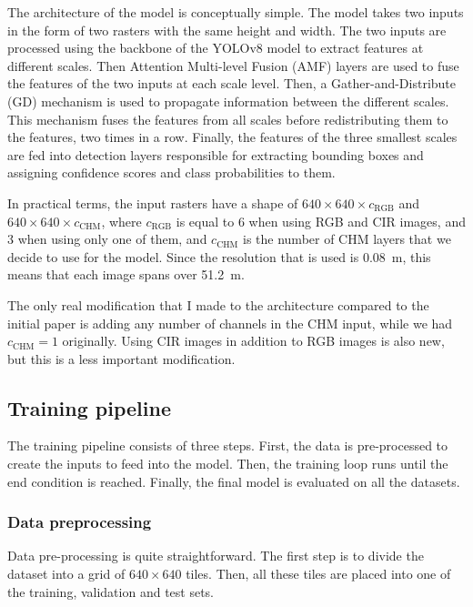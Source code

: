 \documentclass[
  letterpaper,
  DIV=11,
  numbers=noendperiod]{scrartcl}
\begin{document}
The architecture of the model is conceptually simple. The model takes
two inputs in the form of two rasters with the same height and width.
The two inputs are processed using the backbone of the YOLOv8 model
\autocite{yolo} to extract features at different scales. Then Attention
Multi-level Fusion (AMF) layers are used to fuse the features of the two
inputs at each scale level. Then, a Gather-and-Distribute (GD) mechanism
is used to propagate information between the different scales. This
mechanism fuses the features from all scales before redistributing them
to the features, two times in a row. Finally, the features of the three
smallest scales are fed into detection layers responsible for extracting
bounding boxes and assigning confidence scores and class probabilities
to them.

In practical terms, the input rasters have a shape of
\(640 \times 640 \times c_{\text{RGB}}\) and
\(640 \times 640 \times c_{\text{CHM}}\), where \(c_{\text{RGB}}\) is
equal to 6 when using RGB and CIR images, and 3 when using only one of
them, and \(c_{\text{CHM}}\) is the number of CHM layers that we decide
to use for the model. Since the resolution that is used is 0.08~m, this
means that each image spans over 51.2~m.

The only real modification that I made to the architecture compared to
the initial paper is adding any number of channels in the CHM input,
while we had \(c_{\text{CHM}} = 1\) originally. Using CIR images in
addition to RGB images is also new, but this is a less important
modification.

\subsection{Training pipeline}\label{training-pipeline}

The training pipeline consists of three steps. First, the data is
pre-processed to create the inputs to feed into the model. Then, the
training loop runs until the end condition is reached. Finally, the
final model is evaluated on all the datasets.

\subsubsection{Data preprocessing}\label{data-preprocessing}

Data pre-processing is quite straightforward. The first step is to
divide the dataset into a grid of \(640 \times 640\) tiles. Then, all
these tiles are placed into one of the training, validation and test
sets.
\end{document}
